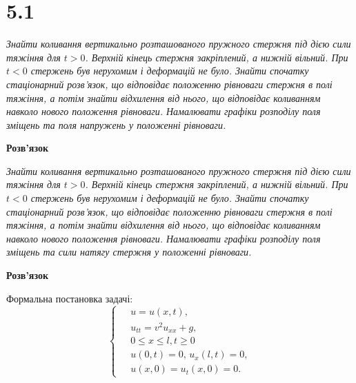 


%


\section[Задача №5.1]{5.1}

\textit{Знайти коливання вертикально розташованого пружного стержня під дією сили тяжіння для $t > 0$. Верхній кінець стержня закріплений, а нижній вільний. При $t < 0$ стержень був нерухомим і деформацій не було. Знайти спочатку стаціонарний розв’язок, що відповідає положенню рівноваги стержня в полі тяжіння, а потім знайти відхилення від нього, що відповідає коливанням навколо нового положення рівноваги. Намалювати графіки розподілу поля зміщень та поля напружень у положенні рівноваги.}

\begin{center}
    \large{\textbf{Розв'язок}}
\end{center}

\textit{Знайти коливання вертикально розташованого пружного стержня під дією сили тяжіння для $t > 0$. Верхній кінець стержня закріплений, а нижній вільний. При $t < 0$ стержень був нерухомим і деформацій не було. Знайти спочатку стаціонарний розв’язок, що відповідає положенню рівноваги стержня в полі тяжіння, а потім знайти відхилення від нього, що відповідає коливанням навколо нового положення рівноваги. Намалювати графіки розподілу поля зміщень та сили натягу стержня у положенні рівноваги.}

\begin{center}
    \large{\textbf{Розв'язок}}
\end{center}

\noindent Формальна постановка задачі:
\begin{equation} \label{cond5,1}
    \left\{ \begin{aligned}
            \;&u = u(x,t), \\
            &u_{tt} = v^2 u_{xx} + g, \\
            &0 \leq x \leq l, t \geq 0 \\
            &u(0,t) = 0, \, u_x(l,t) = 0, \\
            &u(x,0) = u_t(x,0) = 0.
    \end{aligned} \right.
\end{equation}

